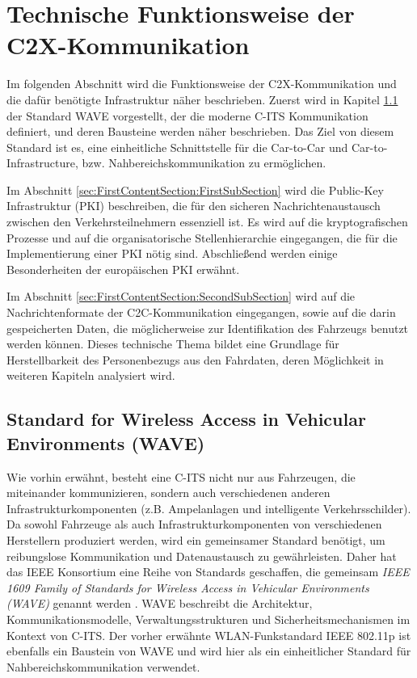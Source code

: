 
\section{Technische  Funktionsweise der C2X-Kommunikation}
\label{ch:FirstContentSection}

Im folgenden Abschnitt wird die Funktionsweise der C2X-Kommunikation und die dafür benötigte Infrastruktur näher beschrieben. Zuerst wird in Kapitel \ref{sec:FirstContentSection:ZeroSubSection} der Standard WAVE vorgestellt, der die moderne C-ITS Kommunikation definiert, und deren Bausteine werden näher beschrieben. Das Ziel von diesem Standard ist es, eine einheitliche Schnittstelle für die Car-to-Car und Car-to-Infrastructure, bzw. Nahbereichskommunikation zu ermöglichen.

Im Abschnitt \ref{sec:FirstContentSection:FirstSubSection} wird die Public-Key Infrastruktur (PKI) beschreiben, die für den sicheren Nachrichtenaustausch zwischen den Verkehrsteilnehmern essenziell ist. Es wird auf die kryptografischen Prozesse und auf die organisatorische Stellenhierarchie eingegangen, die für die Implementierung einer PKI nötig sind. Abschließend werden einige Besonderheiten der europäischen PKI erwähnt.

Im Abschnitt \ref{sec:FirstContentSection:SecondSubSection} wird auf die Nachrichtenformate der C2C-Kommunikation eingegangen, sowie auf die darin gespeicherten Daten, die möglicherweise zur Identifikation des Fahrzeugs benutzt werden können. Dieses technische Thema bildet eine Grundlage für Herstellbarkeit des Personenbezugs aus den Fahrdaten, deren Möglichkeit in weiteren Kapiteln analysiert wird.

\subsection{Standard for Wireless Access in Vehicular Environments (WAVE)}
\label{sec:FirstContentSection:ZeroSubSection}

Wie vorhin erwähnt, besteht eine C-ITS nicht nur aus Fahrzeugen, die miteinander kommunizieren, sondern auch verschiedenen anderen Infrastrukturkomponenten (z.B. Ampelanlagen und intelligente Verkehrsschilder). Da sowohl Fahrzeuge als auch Infrastrukturkomponenten von verschiedenen Herstellern produziert werden, wird ein gemeinsamer Standard benötigt, um reibungslose Kommunikation und Datenaustausch zu gewährleisten. Daher hat das IEEE Konsortium eine Reihe von Standards geschaffen, die gemeinsam \emph{IEEE 1609 Family of Standards for Wireless Access in Vehicular Environments (WAVE)} genannt werden \cite{WAVE}. WAVE beschreibt die Architektur, Kommunikationsmodelle, Verwaltungsstrukturen und Sicherheitsmechanismen im Kontext von C-ITS. Der vorher erwähnte WLAN-Funkstandard IEEE 802.11p ist ebenfalls ein Baustein von WAVE und wird hier als ein einheitlicher Standard für Nahbereichskommunikation verwendet. 

